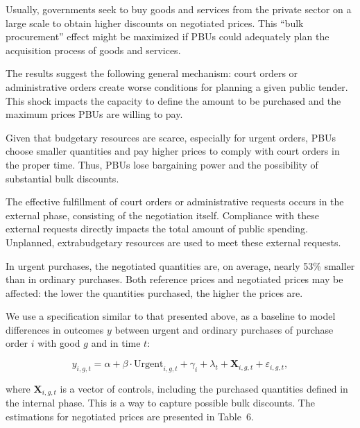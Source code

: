 Usually, governments seek to buy goods and services from the private sector on a large scale to obtain higher discounts on negotiated prices. This “bulk procurement” effect might be maximized if PBUs could adequately plan the acquisition process of goods and services.

The results suggest the following general mechanism: court orders or administrative orders create worse conditions for planning a given public tender. This shock impacts the capacity to define the amount to be purchased and the maximum prices PBUs are willing to pay.

Given that budgetary resources are scarce, especially for urgent orders, PBUs choose smaller quantities and pay higher prices to comply with court orders in the proper time. Thus, PBUs lose bargaining power and the possibility of substantial bulk discounts.

The effective fulfillment of court orders or administrative requests occurs in the external phase, consisting of the negotiation itself. Compliance with these external requests directly impacts the total amount of public spending. Unplanned, extrabudgetary resources are used to meet these external requests.

In urgent purchases, the negotiated quantities are, on average, nearly 53\% smaller than in ordinary purchases. Both reference prices and negotiated prices may be affected: the lower the quantities purchased, the higher the prices are.

We use a specification similar to that presented above, as a baseline to model differences in outcomes $y$ between urgent and ordinary purchases of purchase order $i$ with good $g$ and in time $t$:

\[
y_{i,g,t} = \alpha + \beta \cdot \text{Urgent}_{i,g,t} + \gamma_{i} + \lambda_{t} + \mathbf{X}_{i,g,t} + \varepsilon_{i,g,t},
\]

where $\mathbf{X}_{i,g,t}$ is a vector of controls, including the purchased quantities defined in the internal phase. This is a way to capture possible bulk discounts. The estimations for negotiated prices are presented in Table~6.


